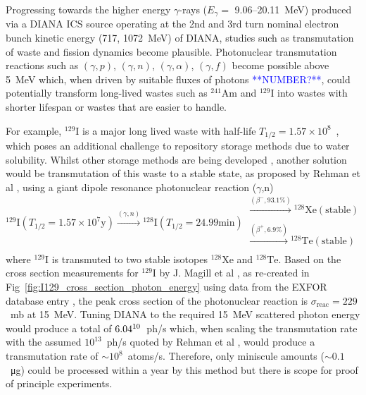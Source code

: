 \documentclass[../main.tex]{subfiles}
\begin{document}
Progressing towards the higher energy $\gamma$-rays ($E_{\gamma} =$ 9.06--20.11~\si{\mega\electronvolt}) produced via a DIANA ICS source operating at the 2nd and 3rd turn nominal electron bunch kinetic energy (717, 1072~\si{\mega\electronvolt}) of DIANA, studies such as transmutation of waste and fission dynamics become plausible. Photonuclear transmutation reactions such as $(\gamma,p)$, $(\gamma,n)$, $(\gamma,\alpha)$, $(\gamma,f)$ become possible above 5~\si{\mega\electronvolt} which, when driven by suitable fluxes of photons \textcolor{blue}{**NUMBER?**}, could potentially transform long-lived wastes such as $^{241}\mathrm{Am}$ and $^{129}\mathrm{I}$ into wastes with shorter lifespan or wastes that are easier to handle. 

For example, $^{129}\mathrm{I}$ is a major long lived waste with half-life $T_{1/2} = 1.57\times 10^{8}$~\si{\years}, which poses an additional challenge to repository storage methods \cite{cho2016reconsideration} due to water solubility. Whilst other storage methods are being developed \cite{lee2021chemical,morizet2021immobilization}, another solution would be transmutation of this waste to a stable state, as proposed by Rehman et al \cite{ur2017optimization}, using a giant dipole resonance photonuclear reaction ($\gamma$,n) 
\begin{equation}
^{129}\mathrm{I} \left(T_{1/2}=1.57\times 10^{7}\textrm{y}\right) \xrightarrow[]{\left(\gamma,n\right)} {}^{128}\mathrm{I} \left(T_{1/2}=24.99\mathrm{\si{\minute}}\right) \substack{\xrightarrow[]{\left(\beta^{-},93.1\%\right)} {}^{128}\mathrm{Xe}\left(\mathrm{stable}\right)\\[0.1em] \xrightarrow[]{\left(\beta^{+},6.9\%\right)} {}^{128}\mathrm{Te}\left(\mathrm{stable}\right)}
\label{eq:129I_photonuclear_transmutation}
\end{equation}
where $^{129}\mathrm{I}$ is transmuted to two stable isotopes $^{128}\mathrm{Xe}$ and $^{128}\mathrm{Te}$. Based on the cross section measurements for $^{129}\mathrm{I}$ by J. Magill et al \cite{magill2003laser}, as re-created in Fig~\ref{fig:I129_cross_section_photon_energy} using data from the EXFOR database entry \cite{zerkin2018experimental}, the peak cross section of the photonuclear reaction is $\sigma_{\mathrm{reac}} = 229$~\si{\milli\barn} at 15~\si{\mega\electronvolt}. Tuning DIANA to the required 15~\si{\mega\electronvolt} scattered photon energy would produce a total of $6.04\time 10^{10}$~ph/\si{\second} which, when scaling the transmutation rate with the assumed $10^{13}$~ph/\si{\second} quoted by Rehman et al \cite{ur2017optimization}, would produce a transmutation rate of $\sim10^{8}$~atoms/\si{\second}. Therefore, only miniscule amounts ($\sim0.1$~\si{\micro\gram}) could be processed within a year by this method but there is scope for proof of principle experiments.  
\end{document}
